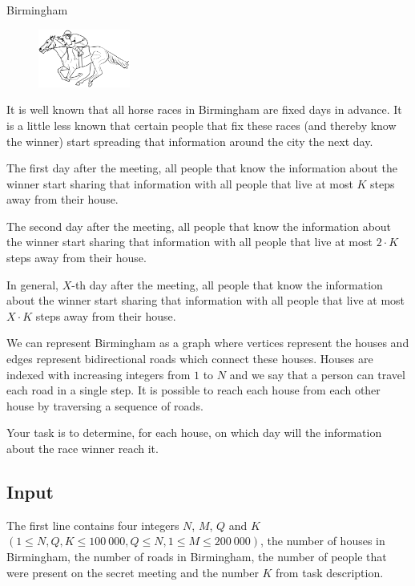\begin{statement}[
  problempoints=70,
  timelimit=1 second,
  memorylimit=512 MiB,
]{Birmingham}

\setlength\intextsep{-0.1cm}
\begin{figure}
\centering
\includegraphics[width=0.27\textwidth]{img/birmingham.png}
\end{figure}

It is well known that all horse races in Birmingham are fixed days in advance.
It is a little less known that certain people that fix these races (and
thereby know the winner) start spreading that information around the city the
next day.

The first day after the meeting, all people that know the information about the
winner start sharing that information with all people that live at most $K$
steps away from their house.

The second day after the meeting, all people that know the information about
the winner start sharing that information with all people that live at most
$2 \cdot K$ steps away from their house.

In general, $X$-th day after the meeting, all people that know the information
about the winner start sharing that information with all people that live at
most $X \cdot K$ steps away from their house.

We can represent Birmingham as a graph where vertices represent the houses and
edges represent bidirectional roads which connect these houses. Houses are
indexed with increasing integers from $1$ to $N$ and we say that a person
can travel each road in a single step. It is possible to reach each house
from each other house by traversing a sequence of roads.

Your task is to determine, for each house, on which day will the information
about the race winner reach it.

\subsection*{Input}
The first line contains four integers $N$, $M$, $Q$ and $K$ $(1 \le N, Q, K \le
100\ 000, Q \le N, 1 \le M \le 200\ 000)$, the number of houses in
Birmingham, the number of roads in Birmingham, the number of people that were
present on the secret meeting and the number $K$ from task description.


\end{statement}
